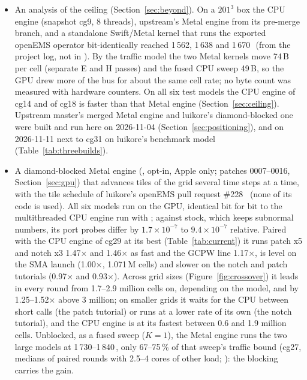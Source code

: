 \begin{itemize}
  CSXCAD changes (times from the project log, not in ).
\item An analysis of the ceiling (Section~\ref{sec:beyond}). On a $201^3$ box the CPU engine (snapshot cg9, 8 threads),
  upstream's Metal engine from its pre-merge  branch, and a standalone Swift/Metal kernel that runs
  the exported openEMS operator bit-identically reached 1\,562, 1\,638 and 1\,670\,\MC\ (from the project log, not in
  ). By the traffic model the two Metal kernels move 74\,B per cell (separate E and H passes) and the
  fused CPU sweep 49\,B, so the GPU drew more of the bus for about the same cell rate; no byte count was measured with
  hardware counters. On all six test models the CPU engine of cg14 and of cg18 is faster than that Metal engine
  (Section~\ref{sec:ceiling}). Upstream master's merged Metal engine and luikore's diamond-blocked one were built and
  run here on 2026-11-04 (Section~\ref{sec:positioning}), and on 2026-11-11 next to cg31 on luikore's benchmark model
  (Table~\ref{tab:threebuilds}).
\item A diamond-blocked Metal engine (, opt-in, Apple only; patches 0007--0016,
  Section~\ref{sec:gpu}) that advances tiles of the grid several time steps at a time, with the tile schedule of
  luikore's openEMS pull request \#228~\cite{luikore228} (none of its code is used). All six models run on the GPU,
  identical bit for bit to the multithreaded CPU engine run with ; against stock, which keeps
  subnormal numbers, its port probes differ by $1.7\times10^{-7}$ to $9.4\times10^{-7}$ relative. Paired with the CPU
  engine of cg29 at its best (Table~\ref{tab:current}) it runs patch x5 and notch x3 1.47$\times$ and 1.46$\times$ as
  fast and the GCPW line 1.17$\times$, is level on the SMA launch (1.00$\times$, 1.071\,M cells) and slower on the
  notch and patch tutorials (0.97$\times$ and 0.93$\times$). Across grid sizes (Figure~\ref{fig:crossover}) it leads
  in every round from 1.7--2.9 million cells on, depending on the model, and by 1.25--1.52$\times$ above 3 million; on
  smaller grids it waits for the CPU between short calls (the patch tutorial) or runs at a lower rate of its own (the
  notch tutorial), and the CPU engine is at its fastest between 0.6 and 1.9 million cells. Unblocked, as a fused sweep ($K=1$), the Metal engine runs the two large
  models at 1\,730--1\,840\,\MC, only 67--75\,\% of that sweep's traffic bound (cg27, medians of paired rounds with
  2.5--4 cores of other load; ): the blocking carries the gain.

\end{itemize}
